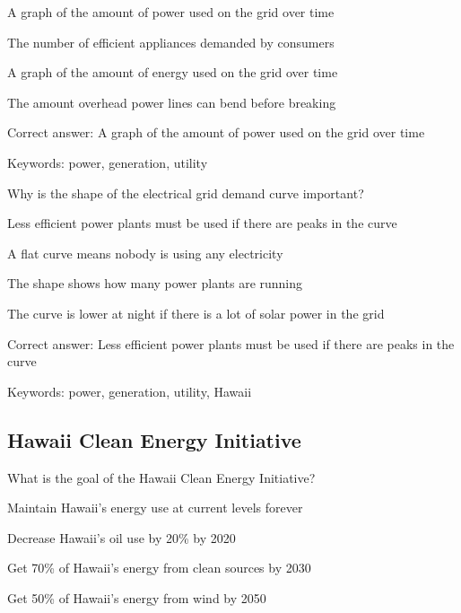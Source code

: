 \begin{answer}
	\item A graph of the amount of power used on the grid over time
	\item The number of efficient appliances demanded by consumers
	\item A graph of the amount of energy used on the grid over time
	\item The amount overhead power lines can bend before breaking
\end{answer}

Correct answer: A graph of the amount of power used on the grid over time

Keywords: power, generation, utility

\begin{question}
	\item Why is the shape of the electrical grid demand curve important?
\end{question}

\begin{answer}
	\item Less efficient power plants must be used if there are peaks in the curve 
	\item A flat curve means nobody is using any electricity
	\item The shape shows how many power plants are running
	\item The curve is lower at night if there is a lot of solar power in the grid
\end{answer}

Correct answer: Less efficient power plants must be used if there are peaks in the curve

Keywords: power, generation, utility, Hawaii

\subsection{Hawaii Clean Energy Initiative}

\begin{question}
	\item What is the goal of the Hawaii Clean Energy Initiative?
\end{question}

\begin{answer}
	\item Maintain Hawaii's energy use at current levels forever
	\item Decrease Hawaii's oil use by 20\% by 2020
	\item Get 70\% of Hawaii's energy from clean sources by 2030
	\item Get 50\% of Hawaii's energy from wind by 2050
\end{answer}

